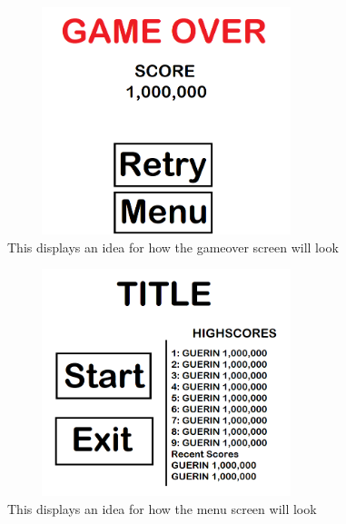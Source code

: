 \documentclass[10pt,conference,onecolumn,compsoc]{IEEEtran}
\begin{document}
\begin{figure}[ht!]
\includegraphics[height=250px, width=350px]{GAMEOVER MOCKUP.png}
\caption{This displays an idea for how the gameover screen will look}
\label{gameover}
\end{figure}

\begin{figure}[ht!]
\includegraphics[height=250px, width=350px]{MOCKUP TITLE.png}
\caption{This displays an idea for how the menu screen will look}
\label{mockup}
\end{figure}
\end{document}

